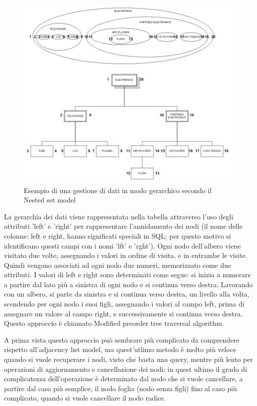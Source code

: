 \begin{figure}[ht!]
    \centering
	\includegraphics[scale=0.55]{images/Nested_Tree_Model_ex.PNG}
	\caption{Esempio di una gestione di dati in modo gerarchico secondo il Nested set model}
\end{figure}

La gerarchia dei dati viene rappresentata nella tabella attraverso l'uso degli attributi 'left' e 'right' per rappresentare l'annidamento
dei nodi (il nome delle colonne: left e right, hanno significati speciali in SQL; per questo motivo si identificano questi campi con i 
nomi 'lft' e 'rght'). 
Ogni nodo dell'albero viene visitato due volte, assegnando i valori in ordine di visita, e in entrambe le visite. Quindi vengono 
associati ad ogni nodo due numeri, memorizzato come due attributi. 
I valori di left e right sono determinati come segue: si inizia a numerare a partire dal lato più a sinistra di ogni nodo e si continua 
verso destra. Lavorando con un albero, si parte da sinistra e si continua verso destra, un livello alla volta, scendendo per ogni
nodo i suoi figli, assegnando i valori al campo left, prima di assegnare un valore al campo right, e successivamente si continua verso 
destra. Questo approccio è chiamato Modified preorder tree traversal algorithm.

A prima vista questo approccio può sembrare più complicato da comprendere rispetto all'adjacency list model, ma quest'utlimo metodo è
molto più veloce quando si vuole recuperare i nodi, visto che basta una query, mentre più lento per operazioni di aggiornamento e 
cancellazione dei nodi; in quest ultimo il grado di complicatezza dell'operazione è determinato dal nodo che si vuole cancellare, a 
partire dal caso più semplice, il nodo foglia (nodo senza figli) fino al caso più complicato, quando si vuole cancellare il nodo radice. \\

